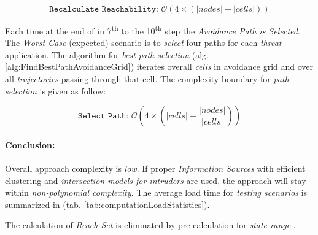 \begin{equation*}
    \texttt{Recalculate Reachability: } \mathscr{O}(4 \times (|nodes| + |cells|))
\end{equation*}

\noindent Each time at the end of in 7\textsuperscript{th} to the 10\textsuperscript{th} step the \emph{Avoidance Path is Selected}. The \emph{Worst Case} (expected) scenario is to \emph{select} four paths for each \emph{threat} application. The algorithm for \emph{best path selection} (alg. \ref{alg:FindBestPathAvoidanceGrid}) iterates overall \emph{cells} in avoidance grid and over all \emph{trajectories} passing through that cell. The complexity boundary for \emph{path selection} is given as follow:

\begin{equation*}
    \texttt{Select Path: } \mathscr{O}\left(4 \times \left(|cells|+\frac{|nodes|}{|cells|}\right)\right)
\end{equation*}


\paragraph{Conclusion:}  Overall approach complexity is \emph{low}. If proper \emph{Information Sources} with efficient clustering and \emph{intersection models for intruders} are used, the approach will stay within \emph{non-polynomial complexity}. 
The average load time for \emph{testing scenarios} is summarized in (tab. \ref{tab:computationLoadStatistics}).

\begin{note}
    The calculation of \emph{Reach Set} is eliminated by pre-calculation for \emph{state range} \cite{gomola2017obstacle}.
\end{note}